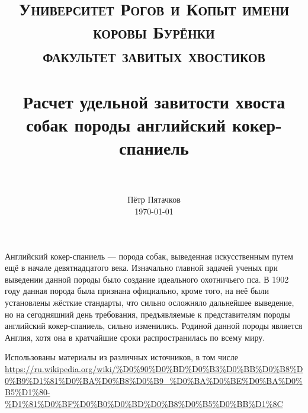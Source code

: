 \documentclass[paper=a4, fontsize=12pt]{scrartcl}
\title{
        \usefont{OT1}{bch}{b}{n}
        \normalfont \normalsize \textsc{Университет Рогов и Копыт имени коровы Бурёнки} \\
        \normalfont \normalsize \textsc{факультет завитых хвостиков} \\ [20pt]
        \horrule{0.5pt} \\[0.4cm]
        \huge Расчет удельной завитости хвоста собак породы английский кокер-спаниель \\
        \horrule{2pt} \\[0.3cm]
}
\author{
        \normalfont \normalsize Пётр Пятачков \\[-3pt]      
        \normalsize \today
}
\date{}
\begin{document}
\maketitle

Английский кокер-спаниель — порода собак, выведенная искусственным путем ещё в начале девятнадцатого века. Изначально главной задачей ученых при выведении данной породы было создание идеального охотничьего пса. В 1902 году данная порода была признана официально, кроме того, на неё были установлены жёсткие стандарты, что сильно осложняло дальнейшее выведение, но на сегодняшний день требования, предъявляемые к представителям породы английский кокер-спаниель, сильно изменились. Родиной данной породы является Англия, хотя она в кратчайшие сроки распространилась по всему миру.


\vfill \small Использованы материалы из различных источников, в том числе \url{https://ru.wikipedia.org/wiki/%D0%90%D0%BD%D0%B3%D0%BB%D0%B8%D0%B9%D1%81%D0%BA%D0%B8%D0%B9_%D0%BA%D0%BE%D0%BA%D0%B5%D1%80-%D1%81%D0%BF%D0%B0%D0%BD%D0%B8%D0%B5%D0%BB%D1%8C}


\end{document}
